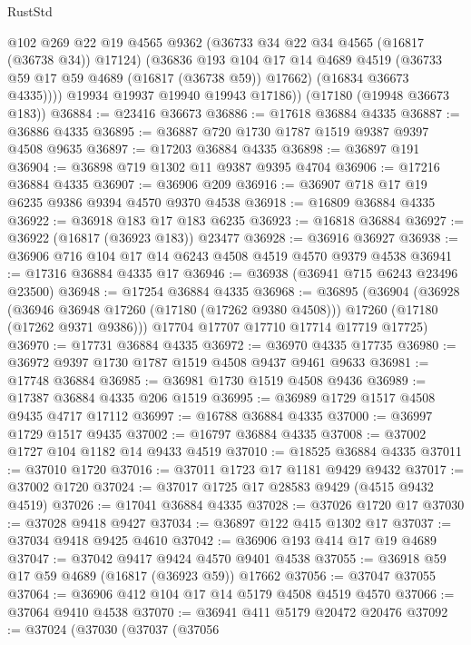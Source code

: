 \begin{lexlean}{RustStd}
\begin{coremodule}
{\begin{coremodule}
{{{{{{{{{{{{{{{{{{{{{{{{{{{{{{{{{{{{{{{{{{{{{{{{{{{{{{{            @102
            @269
            @22
            @19
            @4565
            @9362
            (@36733 @34 @22 @34 @4565 (@16817 (@36738 @34)) @17124)
            (@36836
              @193
              @104
              @17
              @14
              @4689
              @4519
              (@36733 @59 @17 @59 @4689 (@16817 (@36738 @59)) @17662)
              (@16834 @36673 @4335))))
        @19934
        @19937
        @19940
        @19943
        @17186))
    (@17180 (@19948 @36673 @183))
@36884 := @23416 @36673
@36886 := @17618 @36884 @4335
@36887 := @36886 @4335
@36895 := @36887 @720 @1730 @1787 @1519 @9387 @9397 @4508 @9635
@36897 := @17203 @36884 @4335
@36898 := @36897 @191
@36904 := @36898 @719 @1302 @11 @9387 @9395 @4704
@36906 := @17216 @36884 @4335
@36907 := @36906 @209
@36916 := @36907 @718 @17 @19 @6235 @9386 @9394 @4570 @9370 @4538
@36918 := @16809 @36884 @4335
@36922 := @36918 @183 @17 @183 @6235
@36923 := @16818 @36884
@36927 := @36922 (@16817 (@36923 @183)) @23477
@36928 := @36916 @36927
@36938 := @36906 @716 @104 @17 @14 @6243 @4508 @4519 @4570 @9379 @4538
@36941 := @17316 @36884 @4335 @17
@36946 := @36938 (@36941 @715 @6243 @23496 @23500)
@36948 := @17254 @36884 @4335
@36968 := @36895
    (@36904
      (@36928
        (@36946 @36948 @17260 (@17180 (@17262 @9380 @4508)))
        @17260
        (@17180 (@17262 @9371 @9386)))
      @17704
      @17707
      @17710
      @17714
      @17719
      @17725)
@36970 := @17731 @36884 @4335
@36972 := @36970 @4335 @17735
@36980 := @36972 @9397 @1730 @1787 @1519 @4508 @9437 @9461 @9633
@36981 := @17748 @36884
@36985 := @36981 @1730 @1519 @4508 @9436
@36989 := @17387 @36884 @4335 @206 @1519
@36995 := @36989 @1729 @1517 @4508 @9435 @4717 @17112
@36997 := @16788 @36884 @4335
@37000 := @36997 @1729 @1517 @9435
@37002 := @16797 @36884 @4335
@37008 := @37002 @1727 @104 @1182 @14 @9433 @4519
@37010 := @18525 @36884 @4335
@37011 := @37010 @1720
@37016 := @37011 @1723 @17 @1181 @9429 @9432
@37017 := @37002 @1720
@37024 := @37017 @1725 @17 @28583 @9429 (@4515 @9432 @4519)
@37026 := @17041 @36884 @4335
@37028 := @37026 @1720 @17
@37030 := @37028 @9418 @9427
@37034 := @36897 @122 @415 @1302 @17
@37037 := @37034 @9418 @9425 @4610
@37042 := @36906 @193 @414 @17 @19 @4689
@37047 := @37042 @9417 @9424 @4570 @9401 @4538
@37055 := @36918 @59 @17 @59 @4689 (@16817 (@36923 @59)) @17662
@37056 := @37047 @37055
@37064 := @36906 @412 @104 @17 @14 @5179 @4508 @4519 @4570
@37066 := @37064 @9410 @4538
@37070 := @36941 @411 @5179 @20472 @20476
@37092 := @37024
    (@37030
      (@37037
        (@37056
}}}}}}}}}}}}}}}}}}}}}}}}}}}}}}}}}}}}}}}}}}}}}}}}}}}}}}}
\end{coremodule}}
\end{coremodule}
\end{lexlean}
